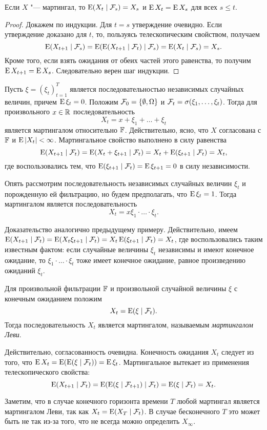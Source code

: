 \begin{proposition}
Если $X$ "--- мартингал, то $\operatorname{E}(X_t\mid \mathcal{F}_s) = X_s$ и $\operatorname{E} X_t = \operatorname{E} X_s$ для всех $s\le t$.
\end{proposition}
\begin{proof}
Докажем по индукции. 
Для $t=s$ утверждение очевидно.
Если утверждение доказано для $t$, то, пользуясь телескопическим свойством, получаем
\[
\operatorname{E} (X_{t+1} \mid \mathcal{F}_s) = \operatorname{E}(\operatorname{E}(X_{t+1}\mid \mathcal{F}_t)\mid \mathcal{F}_s) = \operatorname{E}(X_t\mid \mathcal{F}_s) = X_s.
\]
Кроме того, если взять ожидания от обеих частей этого равенства, то получим $\operatorname{E} X_{t+1} = \operatorname{E} X_s$.
Следовательно верен шаг индукции.
\end{proof}

\begin{example}
Пусть $\xi = (\xi_t)_{t=1}^T$ является последовательностью независимых случайных величин, причем $\operatorname{E}\xi_t=0$.
Положим $\mathcal{F}_0 = \{\emptyset,\Omega\}$ и $\mathcal{F}_t = \sigma(\xi_1,\dots,\xi_t)$.
Тогда для произвольного $x\in\mathbb{R}$ последовательность 
\[
X_t = x + \xi_1 + \ldots + \xi_t
\]
является мартингалом относительно $\mathbb{F}$.
Действительно, ясно, что $X$ согласована с $\mathbb{F}$ и $\operatorname{E}|X_t|<\infty$.
Мартингальное свойство выполнено в силу равенства
\[
\operatorname{E}(X_{t+1}\mid \mathcal{F}_t) = \operatorname{E} (X_t + \xi_{t+1}\mid \mathcal{F}_t) = X_t + \operatorname{E}(\xi_{t+1}\mid \mathcal{F}_t) = X_t,
\]
где воспользовались тем, что $\operatorname{E}(\xi_{t+1}\mid \mathcal{F}_t) = \operatorname{E} \xi_{t+1} = 0$ в силу независимости.
\end{example}

\begin{example}
Опять рассмотрим последовательность независимых случайных величин $\xi_t$ и порожденную ей фильтрацию, но будем предполагать, что $\operatorname{E}\xi_t=1$.
Тогда мартингалом является последовательность
\[
X_t = x\xi_1\cdot \ldots \cdot \xi_t.
\]

Доказательство аналогично предыдущему примеру. Действительно, имеем $\operatorname{E}(X_{t+1}\mid \mathcal{F}_t) = \operatorname{E} (X_t \xi_{t+1}\mid \mathcal{F}_t) = X_t\operatorname{E}(\xi_{t+1}\mid \mathcal{F}_t) = X_t$, где 
воспользовались таким известным фактом: если случайные величины $\xi_t$ независимы и имеют конечное ожидание, то $\xi_1\cdot\ldots\cdot\xi_t$ тоже имеет конечное ожидание, равное произведению ожиданий $\xi_t$.
\end{example}

\begin{example}
Для произвольной фильтрации $\mathbb{F}$ и произвольной случайной величины $\xi$ с конечным ожиданием положим
\[
X_t = \operatorname{E}(\xi\mid \mathcal{F}_t).
\]
Тогда последовательность $X_t$ является мартингалом, называемым \emph{мартингалом Леви}.

Действительно, согласованность очевидна.
Конечность ожидания $X_t$ следует из того, что $\operatorname{E} X_t = \operatorname{E}(\operatorname{E}(\xi\mid \mathcal{F}_t)) = \operatorname{E} \xi_t$. 
Мартингальное вытекает из применения телескопического свойства: 
\[
\operatorname{E}(X_{t+1} \mid \mathcal{F}_t) = \operatorname{E}(\operatorname{E}(\xi\mid\mathcal{F}_{t+1})\mid \mathcal{F}_t) = \operatorname{E}(\xi \mid \mathcal{F}_t) = X_t.
\]

Заметим, что в случае конечного горизонта времени $T$ любой мартингал является мартингалом Леви, так как $X_t = \operatorname{E}(X_T\mid \mathcal{F}_t)$. В случае бесконечного $T$ это может быть не так из-за того, что не всегда можно определить $X_\infty$.
\end{example}

